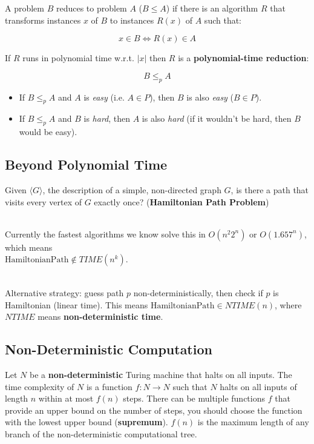 \documentclass[12pt]{article}
\begin{document}
\noindent
A problem $B$ reduces to problem $A$ ($B \leq A$) if there is an algorithm $R$ that transforms instances $x$ of $B$ to instances $R(x)$ of $A$ such that:

\[ x \in B \Leftrightarrow R(x) \in A \]

\noindent
If $R$ runs in polynomial time w.r.t. $|x|$ then $R$ is a \textbf{polynomial-time reduction}:

\[ B \leq_p A \]

\begin{itemize}
    \item If $B \leq_p A$ and $A$ is \textit{easy} (i.e. $A \in P$), then $B$ is also \textit{easy} ($B \in P$).
    \item If $B \leq_p A$ and $B$ is \textit{hard}, then $A$ is also \textit{hard} (if it wouldn't be hard, then $B$ would be easy).
\end{itemize}

\subsection*{Beyond Polynomial Time}
Given $\langle G \rangle$, the description of a simple, non-directed graph $G$, is there a path that visits every vertex of $G$ exactly once? (\textbf{Hamiltonian Path Problem})

\noindent
\\
Currently the fastest algorithms we know solve this in $O(n^2 2^n)$ or $O(1.657^n)$, which means\\$\text{HamiltonianPath} \notin TIME(n^k)$.

\noindent
\\
Alternative strategy: guess path $p$ non-deterministically, then check if $p$ is Hamiltonian (linear time).
This means $\text{HamiltonianPath} \in NTIME(n)$, where $NTIME$ means \textbf{non-deterministic time}.

\newpage
\subsection*{Non-Deterministic Computation}
Let $N$ be a \textbf{non-deterministic} Turing machine that halts on all inputs.
The time complexity of $N$ is a function $f: N \rightarrow N$ such that $N$ halts on all inputs of length $n$ within at most $f(n)$ steps.
There can be multiple functions $f$ that provide an upper bound on the number of steps, you should choose the function with the lowest upper bound (\textbf{supremum}).
$f(n)$ is the maximum length of any branch of the non-deterministic computational tree.
\end{document}
